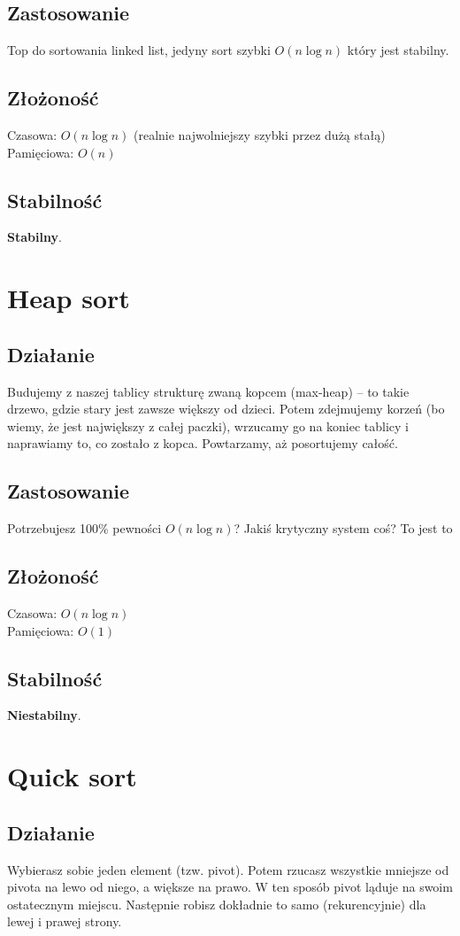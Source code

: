 \documentclass[12pt]{article}
\begin{document}
\subsection{Zastosowanie}
Top do sortowania linked list, jedyny sort szybki $O(n \log n)$ który jest stabilny.
\subsection{Złożoność}
Czasowa: $O(n \log n)$ (realnie najwolniejszy szybki przez dużą stałą)\\
Pamięciowa: $O(n)$
\subsection{Stabilność}
\textbf{Stabilny}.

\section{Heap sort}
\subsection{Działanie}
Budujemy z naszej tablicy strukturę zwaną kopcem (max-heap) – to takie drzewo, gdzie stary jest zawsze większy od dzieci. Potem zdejmujemy korzeń (bo wiemy, że jest największy z całej paczki), wrzucamy go na koniec tablicy i naprawiamy to, co zostało z kopca. Powtarzamy, aż posortujemy całość.
\subsection{Zastosowanie}
Potrzebujesz 100\% pewności $O(n \log n)$? Jakiś krytyczny system coś? To jest to
\subsection{Złożoność}
Czasowa: $O(n \log n)$\\
Pamięciowa: $O(1)$
\subsection{Stabilność}
\textbf{Niestabilny}.

\section{Quick sort}
\subsection{Działanie}
Wybierasz sobie jeden element (tzw. pivot). Potem rzucasz wszystkie mniejsze od pivota na lewo od niego, a większe na prawo. W ten sposób pivot ląduje na swoim ostatecznym miejscu. Następnie robisz dokładnie to samo (rekurencyjnie) dla lewej i prawej strony.
\end{document}
